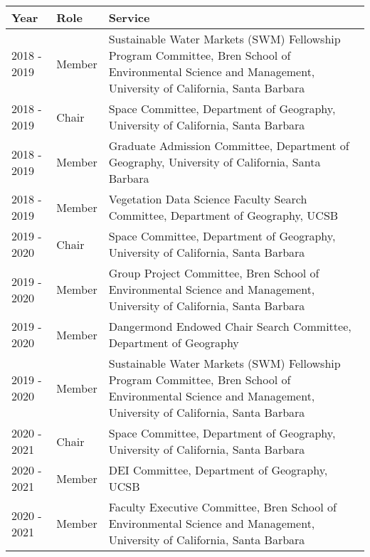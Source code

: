 
\begin{longtable}{llp{12cm}}
Year & Role & Service\\
\hline 
\endhead 
2018 - 2019 & Member  & Sustainable Water Markets (SWM) Fellowship Program Committee, Bren School of Environmental Science and Management, University of California, Santa Barbara \\
2018 - 2019 & Chair & Space Committee, Department of Geography, University of California, Santa Barbara \\
2018 - 2019 & Member & Graduate Admission Committee, Department of Geography, University of California, Santa Barbara \\
2018 - 2019 & Member & Vegetation Data Science Faculty Search Committee, Department of Geography, UCSB \\
2019 - 2020 & Chair & Space Committee, Department of Geography, University of California, Santa Barbara \\
2019 - 2020 & Member & Group Project Committee, Bren School of Environmental Science and Management, University of California, Santa Barbara \\
2019 - 2020 & Member & Dangermond Endowed Chair Search Committee, Department of Geography \\
2019 - 2020 & Member  & Sustainable Water Markets (SWM) Fellowship Program Committee, Bren School of Environmental Science and Management, University of California, Santa Barbara \\
2020 - 2021 & Chair & Space Committee, Department of Geography, University of California, Santa Barbara \\
2020 - 2021 & Member & DEI Committee, Department of Geography, UCSB \\
2020 - 2021 & Member & Faculty Executive Committee, Bren School of Environmental Science and Management, University of California, Santa Barbara \\
\end{longtable}

